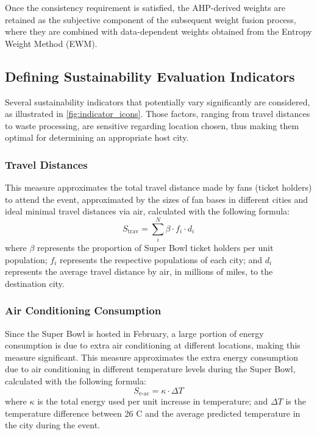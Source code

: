 \documentclass{mcmthesis}
\begin{document}
Once the consistency requirement is satisfied, the AHP-derived weights are retained as the subjective component of the subsequent weight fusion process, where they are combined with data-dependent weights obtained from the Entropy Weight Method (EWM).


\subsection{Defining Sustainability Evaluation Indicators} \label{subsec:defining_indicators}

Several sustainability indicators that potentially vary significantly are considered, as illustrated in \cref{fig:indicator_icons}. Those factors, ranging from travel distances to waste processing, are sensitive regarding location chosen, thus making them optimal for determining an appropriate host city. 


\subsubsection{Travel Distances} \label{subsubsec:indicator_trav_distance}

This measure approximates the total travel distance made by fans (ticket holders) to attend the event, approximated by the sizes of fan bases in different cities and ideal minimal travel distances via air, calculated with the following formula: 
\begin{equation} \label{eq:trav_indicator}
    S_\text{trav} = \sum^N_i \beta \cdot f_i \cdot d_i
\end{equation}
where $\beta$ represents the proportion of Super Bowl ticket holders per unit population; $f_i$ represents the respective populations of each city; and $d_i$ represents the average travel distance by air, in millions of miles, to the destination city. 

\subsubsection{Air Conditioning Consumption} \label{subsubsec:indicator_aircon}

 Since the Super Bowl is hosted in February, a large portion of energy consumption is due to extra air conditioning at different locations, making this measure significant. This measure approximates the extra energy consumption due to air conditioning in different temperature levels during the Super Bowl, calculated with the following formula: 
\begin{equation} \label{eq:aircon}
    S_\text{e-ac} = \kappa \cdot \Delta T
\end{equation}
where $\kappa$ is the total energy used per unit increase in temperature; and $\Delta T$ is the temperature difference between 26 \degree C and the average predicted temperature in the city during the event.
\end{document}
